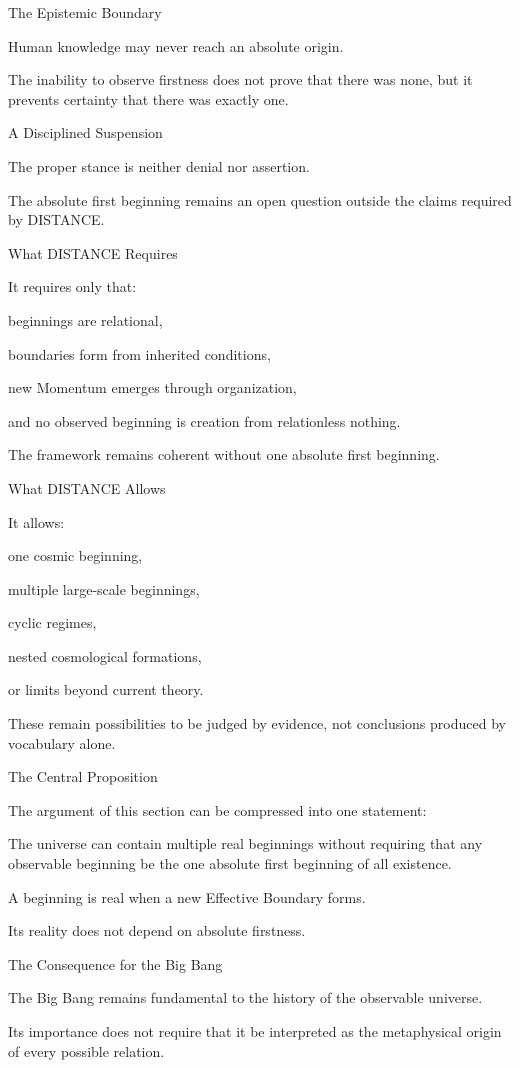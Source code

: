 The Epistemic Boundary

Human knowledge may never reach an absolute origin.

The inability to observe firstness does not prove that there was none, but it prevents certainty that there was exactly one.

A Disciplined Suspension

The proper stance is neither denial nor assertion.

The absolute first beginning remains an open question outside the claims required by DISTANCE.

What DISTANCE Requires

It requires only that:

beginnings are relational,

boundaries form from inherited conditions,

new Momentum emerges through organization,

and no observed beginning is creation from relationless nothing.

The framework remains coherent without one absolute first beginning.

What DISTANCE Allows

It allows:

one cosmic beginning,

multiple large-scale beginnings,

cyclic regimes,

nested cosmological formations,

or limits beyond current theory.

These remain possibilities to be judged by evidence, not conclusions produced by vocabulary alone.

The Central Proposition

The argument of this section can be compressed into one statement:

The universe can contain multiple real beginnings without requiring that any observable beginning be the one absolute first beginning of all existence.

A beginning is real when a new Effective Boundary forms.

Its reality does not depend on absolute firstness.

The Consequence for the Big Bang

The Big Bang remains fundamental to the history of the observable universe.

Its importance does not require that it be interpreted as the metaphysical origin of every possible relation.

